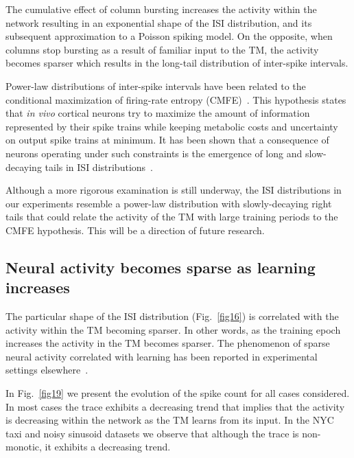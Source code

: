 \documentclass[11pt,letterpaper]{article}
\begin{document}
            The cumulative effect of column bursting increases the activity within the network resulting in an exponential
            shape of the ISI distribution, and its subsequent approximation to a Poisson spiking model.
            On the opposite, when columns stop bursting as a result of familiar input to the TM, the activity
            becomes sparser which results in the long-tail distribution of inter-spike intervals.
            
            Power-law distributions of inter-spike intervals have been related to the conditional maximization
            of firing-rate entropy (CMFE)~\cite{tsubo2012power}.
            This hypothesis states that \emph{in vivo} cortical neurons try to maximize the amount of
            information represented by their spike trains while keeping metabolic costs and 
            uncertainty on output spike trains at minimum.
            It has been shown that a consequence of neurons operating under such constraints is the
            emergence of long and slow-decaying tails in ISI distributions~\cite{tsubo2012power}.
            
            Although a more rigorous examination is still underway,
            the ISI distributions in our experiments resemble a power-law distribution with slowly-decaying
            right tails that could relate the activity of the TM with large training periods to the CMFE hypothesis. 
            This will be a direction of future research.
            
		    
        \subsection{Neural activity becomes sparse as learning increases}
        
		    The particular shape of the ISI distribution (Fig.~\ref{fig16}) is correlated with
		    the activity within the TM becoming sparser.
            In other words, as the training epoch increases the activity in the TM becomes
            sparser.
            The phenomenon of sparse neural activity correlated with learning has been reported 
            in experimental settings elsewhere~\cite{averbeck2006neural,cohen2011measuring}.
            
            In Fig.~\ref{fig19} we present the evolution of the spike count for all cases considered.
            In most cases the trace exhibits a decreasing trend that implies that the activity is
            decreasing within the network as the TM learns from its input.
            In the NYC taxi and noisy sinusoid datasets we observe that although the trace is non-monotic, 
            it exhibits a decreasing trend.
\end{document}
